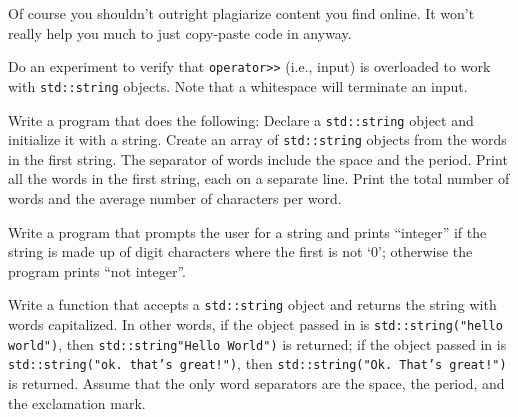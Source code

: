 Of course you shouldn't outright plagiarize content you find online. It won't really help you much to just copy-paste code in anyway.

\newpage{}

\begin{ex}
Do an experiment to verify that \texttt{operator>>} (i.e., input) is overloaded to work with \texttt{std::string} objects. Note that a whitespace will terminate an input.
\end{ex}
\begin{ex}
Write a program that does the following: Declare a
\texttt{std::string} object and initialize it with a string. Create an
array of \texttt{std::string} objects from the words in the first string.
The separator of words include the space and the period. Print all the
words in the first string, each on a separate line. Print the total
number of words and the average number of characters per word.
\end{ex}
\begin{ex}
Write a program that prompts the user for a string
and prints ``integer'' if the string is made up of digit characters
where the first is not `0'; otherwise the program prints ``not
integer''.
\end{ex}
\begin{ex}
Write a function that accepts a \texttt{std::string}
object and returns the string with words capitalized. In other words, if
the object passed in is \texttt{std::string("hello world")}, then
\texttt{std::string"Hello World")} is returned; if the object passed in is
\texttt{std::string("ok. that's great!")}, then \texttt{std::string("Ok.
That's great!")} is returned. Assume that the only word separators are
the space, the period, and the exclamation mark.
\end{ex}
